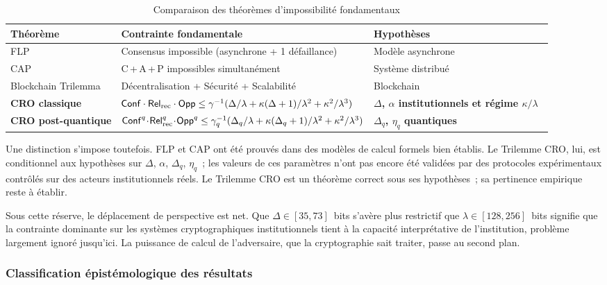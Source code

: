 \begin{sloppypar}
\begin{table}[htbp]
\centering
\caption{Comparaison des th\'eor\`emes d'impossibilit\'e fondamentaux}
\label{tab:comparaison_impossibilites}
\begin{tabular}{@{}p{2.8cm}p{4cm}p{4.5cm}@{}}
\toprule
\textbf{Th\'eor\`eme} & \textbf{Contrainte fondamentale}
  & \textbf{Hypoth\`eses} \\
\midrule
FLP & Consensus impossible (asynchrone + 1 d\'efaillance)
  & Mod\`ele asynchrone~\cite{FLP85,Attiya2004} \\
CAP & C\,+\,A\,+\,P impossibles simultan\'ement
  & Syst\`eme distribu\'e~\cite{Brewer00,GilbertLynch02} \\
Blockchain Trilemma & D\'ecentralisation + S\'ecurit\'e + Scalabilit\'e
  & Blockchain~\cite{Buterin2014,Abadi2012} \\
\textbf{CRO classique} & $\mathsf{Conf}\cdot\mathsf{Rel}_{\mathrm{rec}}\cdot\mathsf{Opp} \le \gamma^{-1}(\Delta/\lambda + \kappa(\Delta+1)/\lambda^2 + \kappa^2/\lambda^3)$
    & \textbf{$\Delta$, $\alpha$ institutionnels et r\'egime $\kappa/\lambda$}~\cite{MINKA2026CRO} \\
\textbf{CRO post-quantique} &
  $\mathsf{Conf}^q\!\cdot\!\mathsf{Rel}_{\mathrm{rec}}^q\!\cdot\!\mathsf{Opp}^q \le
   \gamma_q^{-1}(\Delta_q/\lambda + \kappa(\Delta_q+1)/\lambda^2 + \kappa^2/\lambda^3)$
  & \textbf{$\Delta_q$, $\eta_q$ quantiques}~\cite{MINKA2026PQCRO} \\
\bottomrule
\end{tabular}
\end{table}

Une distinction s'impose toutefois. FLP et CAP ont \'et\'e prouv\'es dans des
mod\`eles de calcul formels bien
\'etablis. Le Trilemme CRO, lui, est conditionnel
aux hypoth\`eses sur $\Delta$, $\alpha$, $\Delta_q$,
$\eta_q$~; les valeurs de ces param\`etres n'ont pas encore \'et\'e
valid\'ees par des protocoles exp\'erimentaux contr\^ol\'es sur des
acteurs institutionnels r\'eels. Le Trilemme
CRO est un th\'eor\`eme correct sous ses hypoth\`eses~; sa pertinence
empirique reste \`a \'etablir.

Sous cette r\'eserve, le d\'eplacement de perspective est net. Que
$\Delta \in [35, 73]$~bits s'av\`ere plus restrictif que
$\lambda \in [128, 256]$~bits signifie que la contrainte dominante sur
les syst\`emes cryptographiques institutionnels tient \`a la capacit\'e
interpr\'etative de l'institution, probl\`eme largement ignor\'e
jusqu'ici. La puissance de calcul de l'adversaire, que la cryptographie sait
traiter, passe au second plan.

\subsubsection{Classification \'epist\'emologique des r\'esultats}
\label{subsubsec:classification_epistemologique}


\end{sloppypar}
